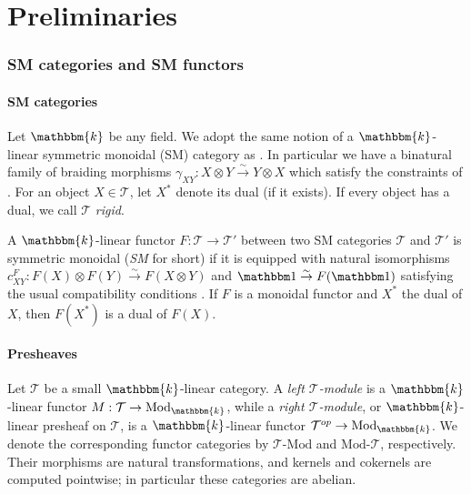 \documentclass[11pt,a4paper]{amsart}
\theoremstyle{plain}%
\theoremstyle{definition}
\theoremstyle{remark}
\newcommand{\triv}{{\mathbbm 1}}
\newcommand{\kk}{\mathbbm{k}}
\begin{document}

\part{Preliminaries}

\section{SM categories and SM functors} 
\subsection{SM categories}
Let $\kk$ be any field. We adopt the same notion of a $\kk$-linear symmetric monoidal (SM) category as \cite{Deligne-Milne}. In particular we have a binatural family of braiding morphisms $\gamma_{XY}:X\otimes Y\stackrel{\sim}{\to} Y\otimes X$ which satisfy the constraints of \cite{Deligne-Milne}. For an object $X\in \mathcal{T}$, let $X^*$ {denote} its dual (if it exists). If every object has a dual, we call $\mathcal{T}$ \emph{rigid}.

\medskip
A $\kk$-linear functor $F:\mathcal{T}\to \mathcal{T}'$ between two SM categories $\mathcal{T}$ and $\mathcal{T}'$ is symmetric monoidal (\emph{SM} for short) if it is equipped with natural isomorphisms $c_{XY}^F:F(X)\otimes F(Y)\stackrel{\sim}{\to}F(X\otimes Y)$ and $\triv\stackrel{\sim}{\to}F(\triv)$ satisfying the usual  compatibility conditions \cite[Definition 1.8]{Deligne-Milne}. If $F$ is a monoidal functor and $X^*$ the dual of $X$, then $F(X^\ast)$ is a dual of $F(X)$.





\subsection{Presheaves}

Let $\mathcal{T}$ be a small $\kk$-linear category. A \emph{left $\mathcal{T}$-module} is a $\kk$-linear functor $M:\mathcal{T}\to \mathrm{Mod}_\kk$, while a \emph{right $\mathcal{T}$-module}, or $\kk$-linear presheaf on $\mathcal{T}$, is a $\kk$-linear functor $\mathcal{T}^{op}\to \mathrm{Mod}_\kk$. We denote the corresponding functor categories by $\mathcal{T}\text{-}\mathrm{Mod}$ and $\mathrm{Mod}\text{-}\mathcal{T}$, respectively. Their morphisms are natural transformations, and kernels and cokernels are computed pointwise; in particular these categories are abelian.
\end{document}
